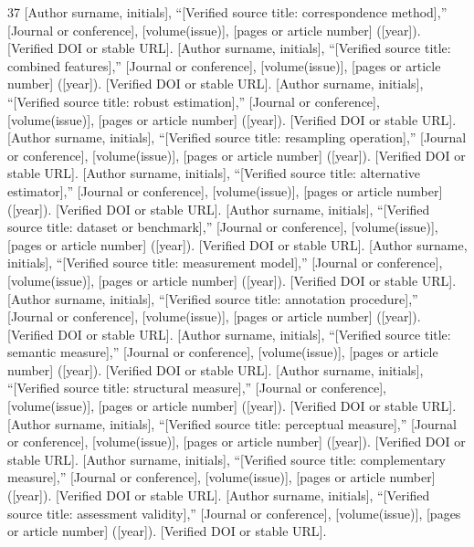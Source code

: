 \begin{thebibliography}{37}
 [Author surname, initials], ``[Verified source title: correspondence method],'' [Journal or conference], [volume(issue)], [pages or article number] ([year]). [Verified DOI or stable URL].
 [Author surname, initials], ``[Verified source title: combined features],'' [Journal or conference], [volume(issue)], [pages or article number] ([year]). [Verified DOI or stable URL].
 [Author surname, initials], ``[Verified source title: robust estimation],'' [Journal or conference], [volume(issue)], [pages or article number] ([year]). [Verified DOI or stable URL].
 [Author surname, initials], ``[Verified source title: resampling operation],'' [Journal or conference], [volume(issue)], [pages or article number] ([year]). [Verified DOI or stable URL].
 [Author surname, initials], ``[Verified source title: alternative estimator],'' [Journal or conference], [volume(issue)], [pages or article number] ([year]). [Verified DOI or stable URL].
 [Author surname, initials], ``[Verified source title: dataset or benchmark],'' [Journal or conference], [volume(issue)], [pages or article number] ([year]). [Verified DOI or stable URL].
 [Author surname, initials], ``[Verified source title: measurement model],'' [Journal or conference], [volume(issue)], [pages or article number] ([year]). [Verified DOI or stable URL].
 [Author surname, initials], ``[Verified source title: annotation procedure],'' [Journal or conference], [volume(issue)], [pages or article number] ([year]). [Verified DOI or stable URL].
 [Author surname, initials], ``[Verified source title: semantic measure],'' [Journal or conference], [volume(issue)], [pages or article number] ([year]). [Verified DOI or stable URL].
 [Author surname, initials], ``[Verified source title: structural measure],'' [Journal or conference], [volume(issue)], [pages or article number] ([year]). [Verified DOI or stable URL].
 [Author surname, initials], ``[Verified source title: perceptual measure],'' [Journal or conference], [volume(issue)], [pages or article number] ([year]). [Verified DOI or stable URL].
 [Author surname, initials], ``[Verified source title: complementary measure],'' [Journal or conference], [volume(issue)], [pages or article number] ([year]). [Verified DOI or stable URL].
 [Author surname, initials], ``[Verified source title: assessment validity],'' [Journal or conference], [volume(issue)], [pages or article number] ([year]). [Verified DOI or stable URL].
\end{thebibliography}
